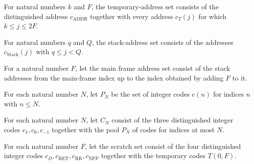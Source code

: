 \begin{definition}
\label{Light.Compiler.Temps}
\leanok
{}
For natural numbers $k$ and $F$, the temporary-address set consists of the distinguished
address $c_{\mathrm{ADDR}}$ together with every address $c_T(j)$ for which $k\le j\le
2F$.
\end{definition}

\begin{definition}
\label{Light.Compiler.Stack}
\leanok
{}
For natural numbers $q$ and $Q$, the stack-address set consists of the addresses
$c_{\mathrm{Stack}}(j)$ with $q\le j<Q$.
\end{definition}

\begin{definition}
\label{Light.Compiler.MainFrame}
\leanok
{}
For a natural number $F$, let the main frame address set consist of the stack addresses
from the main-frame index up to the index obtained by adding $F$ to it.
\end{definition}

\begin{definition}
\label{Light.Compiler.Pool}
\leanok
{}
For each natural number $N$, let $P_N$ be the set of integer codes $c(n)$ for indices
$n$ with $n\le N$.
\end{definition}

\begin{definition}
\label{Light.Compiler.Constants}
\leanok
{}
For each natural number $N$, let $C_N$ consist of the three distinguished integer codes
$c_1,c_0,c_{-1}$ together with the pool $P_N$ of codes for indices at most $N$.
\end{definition}

\begin{definition}
\label{Light.Compiler.Scratch}
\leanok
{}
For each natural number $F$, let the scratch set consist of the four distinguished
integer codes $c_D,c_{\mathrm{RET}},c_{\mathrm{RR}},c_{\mathrm{NFP}}$ together with the
temporary codes $T(0,F)$.
\end{definition}

